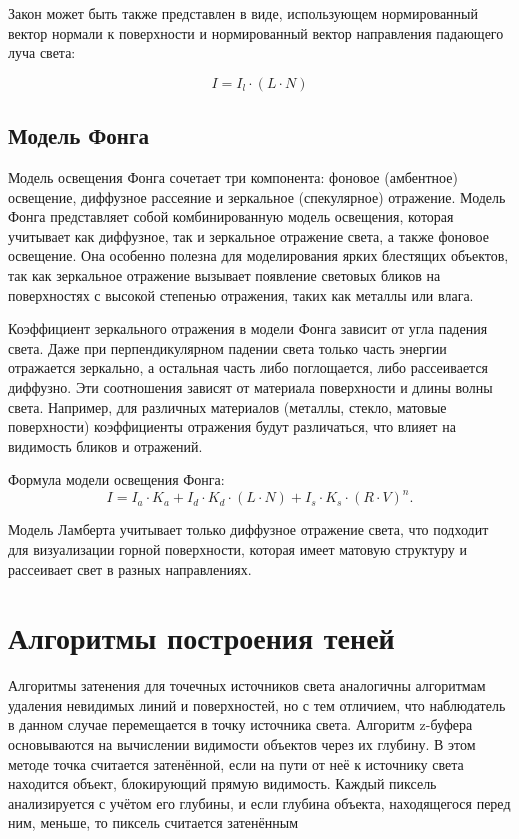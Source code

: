 Закон может быть также представлен в виде, использующем нормированный вектор нормали к поверхности и нормированный вектор направления падающего луча света:

\begin{equation}
	I = I_l \cdot (L \cdot N)
\end{equation}


\subsection{Модель Фонга}

Модель освещения Фонга сочетает три компонента: фоновое (амбентное) освещение, диффузное рассеяние и зеркальное (спекулярное) отражение.
Модель Фонга представляет собой комбинированную модель освещения, которая учитывает как диффузное, так и зеркальное отражение света, а также фоновое освещение. Она особенно полезна для моделирования ярких блестящих объектов, так как зеркальное отражение вызывает появление световых бликов на поверхностях с высокой степенью отражения, таких как металлы или влага.

Коэффициент зеркального отражения в модели Фонга зависит от угла падения света. Даже при перпендикулярном падении света только часть энергии отражается зеркально, а остальная часть либо поглощается, либо рассеивается диффузно. Эти соотношения зависят от материала поверхности и длины волны света. Например, для различных материалов (металлы, стекло, матовые поверхности) коэффициенты отражения будут различаться, что влияет на видимость бликов и отражений.

Формула модели освещения Фонга:
\begin{equation}
I = I_a \cdot K_a + I_d \cdot K_d \cdot (L \cdot N) + I_s \cdot K_s \cdot (R \cdot V)^n.
\end{equation}

Модель Ламберта учитывает только диффузное отражение света, что подходит для визуализации горной поверхности, которая имеет матовую структуру и рассеивает свет в разных направлениях.

\section{Алгоритмы построения теней}
Алгоритмы затенения для точечных источников света аналогичны алгоритмам удаления невидимых линий и поверхностей, но с тем отличием, что наблюдатель в данном случае перемещается в точку источника света. Алгоритм z-буфера основываются на вычислении видимости объектов через их глубину. В этом методе точка считается затенённой, если на пути от неё к источнику света находится объект, блокирующий прямую видимость. Каждый пиксель анализируется с учётом его глубины, и если глубина объекта, находящегося перед ним, меньше, то пиксель считается затенённым

